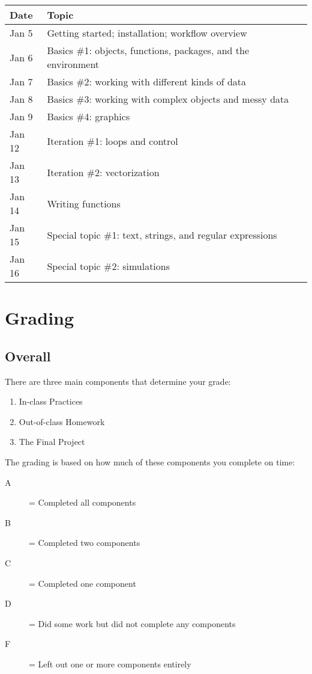 \documentclass{tufte-handout}
\begin{document}
\begin{center}
\begin{tabular}{ll}
 Date    &  Topic                                                          \\
\hline
 Jan 5   &  Getting started; installation; workflow overview               \\
 Jan 6   &  Basics \#1: objects, functions, packages, and the environment  \\
 Jan 7   &  Basics \#2: working with different kinds of data               \\
 Jan 8   &  Basics \#3: working with complex objects and messy data        \\
 Jan 9   &  Basics \#4: graphics                                           \\
 Jan 12  &  Iteration \#1: loops and control                               \\
 Jan 13  &  Iteration \#2: vectorization                                   \\
 Jan 14  &  Writing functions                                              \\
 Jan 15  &  Special topic \#1: text, strings, and regular expressions      \\
 Jan 16  &  Special topic \#2: simulations                                 \\
\end{tabular}
\end{center}
\section*{Grading}
\label{sec-6}
\subsection*{Overall}
\label{sec-6-1}

There are three main components that determine your grade:
\begin{enumerate}
\item In-class Practices
\item Out-of-class Homework
\item The Final Project
\end{enumerate}

The grading is based on how much of these components you complete on time:
\begin{description}
\item[A] = Completed all components
\item[B] = Completed two components
\item[C] = Completed one component
\item[D] = Did some work but did not complete any components
\item[F] = Left out one or more components entirely
\end{description}
\end{document}
